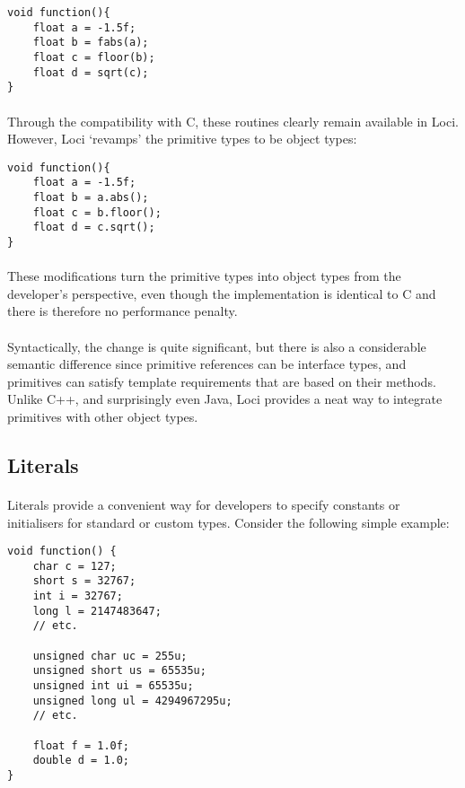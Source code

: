 \documentclass[12pt,twoside,notitlepage]{report}
\begin{document}
\begin{lstlisting}
void function(){
	float a = -1.5f;
	float b = fabs(a);
	float c = floor(b);
	float d = sqrt(c);
}
\end{lstlisting}


\paragraph{}
Through the compatibility with C, these routines clearly remain available in Loci. However, Loci `revamps' the primitive types to be object types:


\begin{lstlisting}
void function(){
	float a = -1.5f;
	float b = a.abs();
	float c = b.floor();
	float d = c.sqrt();
}
\end{lstlisting}


\paragraph{}
These modifications turn the primitive types into object types from the developer's perspective, even though the implementation is identical to C and there is therefore no performance penalty.

\paragraph{}
Syntactically, the change is quite significant, but there is also a considerable semantic difference since primitive references can be interface types, and primitives can satisfy template requirements that are based on their methods. Unlike C++, and surprisingly even Java, Loci provides a neat way to integrate primitives with other object types.

\clearpage

\subsection{Literals}

\paragraph{}
Literals provide a convenient way for developers to specify constants or initialisers for standard or custom types. Consider the following simple example:

\begin{lstlisting}
void function() {
	char c = 127;
	short s = 32767;
	int i = 32767;
	long l = 2147483647;
	// etc.
	
	unsigned char uc = 255u;
	unsigned short us = 65535u;
	unsigned int ui = 65535u;
	unsigned long ul = 4294967295u;
	// etc.
	
	float f = 1.0f;
	double d = 1.0;
}
\end{lstlisting}
\end{document}
